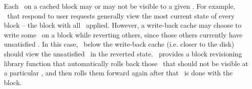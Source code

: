 Each \chdesc\ on a cached block may or may not be visible to a given \module.
For example, \modules\ that respond to user requests generally view the most
current state of every block -- the block with all \chdescs\ applied. However, a
write-back cache may choose to write some \chdescs\ on a block while reverting
others, since those others currently have unsatisfied \befores. In this case,
\modules\ below the write-back cache (i.e. closer to the disk) should view the
unsatisfied \chdescs\ in the reverted state. \Kudos\ provides a block
revisioning library function that automatically rolls back those \chdescs\ that
should not be visible at a particular \module, and then rolls them forward again
after that \module\ is done with the block.

